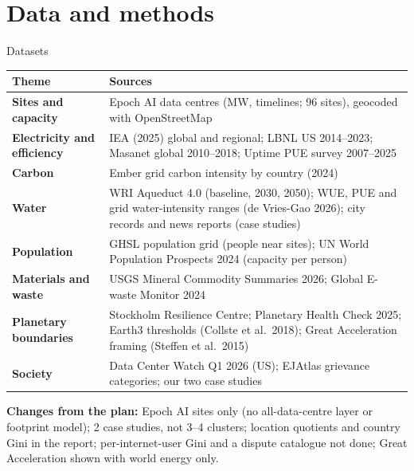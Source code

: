 \section{Data and methods}

\begin{frame}{Datasets}{}
  {\scriptsize\renewcommand{\arraystretch}{1.0}
  \begin{tabularx}{\textwidth}{@{}>{\bfseries}l >{\raggedright\arraybackslash}X@{}}
    \toprule
    Theme & Sources \\
    \midrule
    Sites and capacity & Epoch AI data centres (MW, timelines; 96 sites), geocoded with OpenStreetMap \\
    Electricity and efficiency & IEA (2025) global and regional; LBNL US 2014–2023; Masanet global 2010–2018; Uptime PUE survey 2007–2025 \\
    Carbon & Ember grid carbon intensity by country (2024) \\
    Water & WRI Aqueduct 4.0 (baseline, 2030, 2050); WUE, PUE and grid water-intensity ranges (de Vries-Gao 2026); city records and news reports (case studies) \\
    Population & GHSL population grid (people near sites); UN World Population Prospects 2024 (capacity per person) \\
    Materials and waste & USGS Mineral Commodity Summaries 2026; Global E-waste Monitor 2024 \\
    Planetary boundaries & Stockholm Resilience Centre; Planetary Health Check 2025; Earth3 thresholds (Collste et al.\ 2018); Great Acceleration framing (Steffen et al.\ 2015) \\
    Society & Data Center Watch Q1 2026 (US); EJAtlas grievance categories; our two case studies \\
    \bottomrule
  \end{tabularx}}
  \par\smallskip
  {\scriptsize\textbf{Changes from the plan:} Epoch AI sites only (no all-data-centre layer or footprint model); 2 case
  studies, not 3–4 clusters; location quotients and country Gini in the report; per-internet-user Gini and a dispute
  catalogue not done; Great Acceleration shown with world energy only.\par}
\end{frame}
